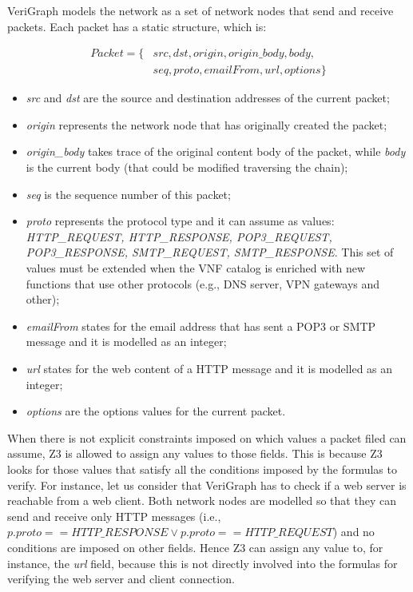 VeriGraph models the network as a set of network nodes that send and receive packets. Each packet has a static structure, which is:
\begin{figure}[h]
	{\footnotesize
		\begin{equation}
				\begin{split}
					Packet = \{& src, dst, origin, origin\_body, body,\\
					&   seq, proto, emailFrom, url, options\}
				\end{split}
		\end{equation}}
	\end{figure}
\begin{itemize}
	\item \textit{src} and \textit{dst} are the source and destination addresses of the current packet;
	\item \textit{origin} represents the network node that has originally created the packet;
	\item \textit{origin\_body} takes trace of the original content body of the packet, while \textit{body} is the current body (that could be modified traversing the chain);
	\item \textit{seq} is the sequence number of this packet;
	\item \textit{proto} represents the protocol type and it can assume as values: \textit{HTTP\_REQUEST, HTTP\_RESPONSE, POP3\_REQUEST, POP3\_RESPONSE, SMTP\_REQUEST, SMTP\_RESPONSE}. This set of values must be extended when the VNF catalog is enriched with new functions that use other protocols (e.g., DNS server, VPN gateways and other);
	\item \textit{emailFrom} states for the email address that has sent a POP3 or SMTP message and it is modelled as an integer;
	\item\textit{url} states for the web content of a HTTP message and it is modelled as an integer;
	\item \textit{options} are the options values for the current packet.
\end{itemize}
 When there is not explicit constraints imposed on which values a packet filed can assume, Z3 is allowed to assign any values to those fields. This is because Z3 looks for those values that satisfy all the conditions imposed by the formulas to verify. For instance, let us consider that VeriGraph has to check if a web server is reachable from a web client. Both network nodes are modelled so that they can send and receive only HTTP messages (i.e., \textit{$p.proto == HTTP\_RESPONSE \vee p.proto == HTTP\_REQUEST$}) and no conditions are imposed on other fields. Hence Z3 can assign any value to, for instance, the \textit{url} field, because this is not directly involved into the formulas for verifying the web server and client connection.

